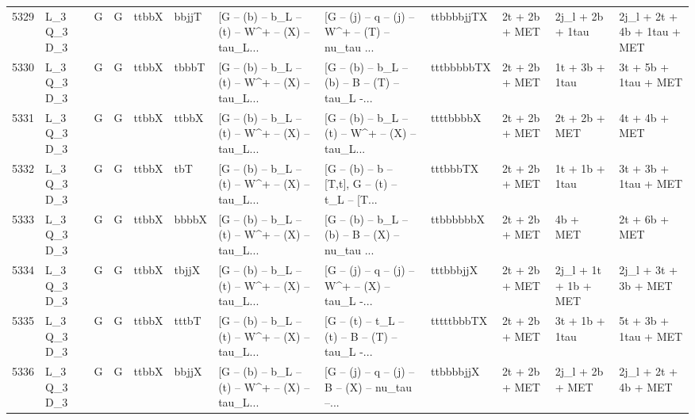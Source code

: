 \begin{tabular}{llllllllllll}
5329 &  L\_3 Q\_3 D\_3 &     G &     G &       ttbbX &       bbjjT &  [G -- (b) -- b\_L -- (t) -- W\textasciicircum + -- (X) -- tau\_L... &  [G -- (j) -- q -- (j) -- W\textasciicircum + -- (T) -- nu\_tau ... &  ttbbbbjjTX &            2t + 2b + MET &         2j\_l + 2b + 1tau &        2j\_l + 2t + 4b + 1tau + MET \\
5330 &  L\_3 Q\_3 D\_3 &     G &     G &       ttbbX &       tbbbT &  [G -- (b) -- b\_L -- (t) -- W\textasciicircum + -- (X) -- tau\_L... &  [G -- (b) -- b\_L -- (b) -- B -- (T) -- tau\_L -... &  tttbbbbbTX &            2t + 2b + MET &           1t + 3b + 1tau &               3t + 5b + 1tau + MET \\
5331 &  L\_3 Q\_3 D\_3 &     G &     G &       ttbbX &       ttbbX &  [G -- (b) -- b\_L -- (t) -- W\textasciicircum + -- (X) -- tau\_L... &  [G -- (b) -- b\_L -- (t) -- W\textasciicircum + -- (X) -- tau\_L... &   ttttbbbbX &            2t + 2b + MET &            2t + 2b + MET &                      4t + 4b + MET \\
5332 &  L\_3 Q\_3 D\_3 &     G &     G &       ttbbX &         tbT &  [G -- (b) -- b\_L -- (t) -- W\textasciicircum + -- (X) -- tau\_L... &  [G -- (b) -- b -- [T,t], G -- (t) -- t\_L -- [T... &    tttbbbTX &            2t + 2b + MET &           1t + 1b + 1tau &               3t + 3b + 1tau + MET \\
5333 &  L\_3 Q\_3 D\_3 &     G &     G &       ttbbX &       bbbbX &  [G -- (b) -- b\_L -- (t) -- W\textasciicircum + -- (X) -- tau\_L... &  [G -- (b) -- b\_L -- (b) -- B -- (X) -- nu\_tau ... &   ttbbbbbbX &            2t + 2b + MET &                 4b + MET &                      2t + 6b + MET \\
5334 &  L\_3 Q\_3 D\_3 &     G &     G &       ttbbX &       tbjjX &  [G -- (b) -- b\_L -- (t) -- W\textasciicircum + -- (X) -- tau\_L... &  [G -- (j) -- q -- (j) -- W\textasciicircum + -- (X) -- tau\_L -... &   tttbbbjjX &            2t + 2b + MET &     2j\_l + 1t + 1b + MET &               2j\_l + 3t + 3b + MET \\
5335 &  L\_3 Q\_3 D\_3 &     G &     G &       ttbbX &       tttbT &  [G -- (b) -- b\_L -- (t) -- W\textasciicircum + -- (X) -- tau\_L... &  [G -- (t) -- t\_L -- (t) -- B -- (T) -- tau\_L -... &  tttttbbbTX &            2t + 2b + MET &           3t + 1b + 1tau &               5t + 3b + 1tau + MET \\
5336 &  L\_3 Q\_3 D\_3 &     G &     G &       ttbbX &       bbjjX &  [G -- (b) -- b\_L -- (t) -- W\textasciicircum + -- (X) -- tau\_L... &  [G -- (j) -- q -- (j) -- B -- (X) -- nu\_tau --... &   ttbbbbjjX &            2t + 2b + MET &          2j\_l + 2b + MET &               2j\_l + 2t + 4b + MET \\

\end{tabular}
